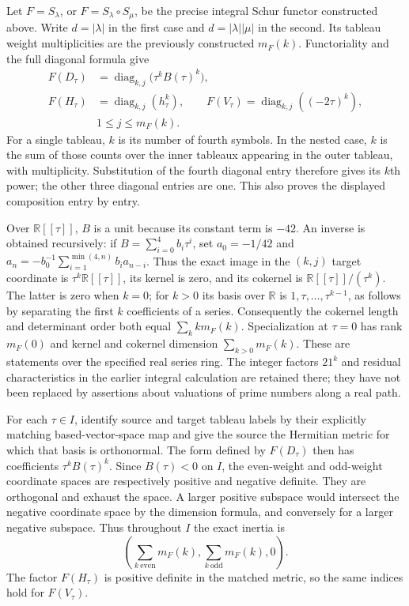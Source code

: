 Let $F=S_\lambda$, or $F=S_\lambda\circ S_\mu$, be the precise
integral Schur functor constructed above. Write $d=|\lambda|$ in
the first case and $d=|\lambda||\mu|$ in the second. Its tableau
weight multiplicities are the previously constructed $m_F(k)$.
Functoriality and the full diagonal formula give
\begin{equation}\label{eq:ns-schur-path-diagonal}
 \begin{aligned}
 F(D_\tau)&=\operatorname{diag}_{k,j}
       \bigl(\tau^k B(\tau)^k\bigr),\\
 F(H_\tau)&=\operatorname{diag}_{k,j}(h_\tau^k),\qquad
 F(V_\tau)=\operatorname{diag}_{k,j}((-2\tau)^k),\\
 &1\leq j\leq m_F(k).
 \end{aligned}
\end{equation}
For a single tableau, $k$ is its number of fourth symbols. In the
nested case, $k$ is the sum of those counts over the inner tableaux
appearing in the outer tableau, with multiplicity. Substitution of the fourth diagonal entry therefore
gives its $k$th power; the other three diagonal entries are one.
This also proves the displayed composition entry by entry.

Over $\mathbb R[[\tau]]$, $B$ is a unit because its constant term
is $-42$. An inverse is obtained recursively: if
$B=\sum_{i=0}^4b_i\tau^i$, set $a_0=-1/42$ and
$a_n=-b_0^{-1}\sum_{i=1}^{\min(4,n)}b_i a_{n-i}$.
Thus the exact image in the $(k,j)$ target coordinate is
$\tau^k\mathbb R[[\tau]]$, its kernel is zero, and its cokernel
is $\mathbb R[[\tau]]/(\tau^k)$. The latter is zero when $k=0$;
for $k>0$ its basis over $\mathbb R$ is $1,\tau,\ldots,\tau^{k-1}$,
as follows by separating the first $k$ coefficients of a series.
Consequently the cokernel length and determinant order both equal
$\sum_k k m_F(k)$. Specialization at $\tau=0$ has rank $m_F(0)$
and kernel and cokernel dimension $\sum_{k>0}m_F(k)$.
These are statements over the specified real series ring. The integer
factors $21^k$ and residual characteristics in the earlier integral
calculation are retained there; they have not been replaced by assertions
about valuations of prime numbers along a real path.

For each $\tau\in I$, identify source and target tableau labels by
their explicitly matching based-vector-space map and give the source
the Hermitian metric for which that basis is orthonormal. The form
defined by $F(D_\tau)$ then has coefficients $\tau^kB(\tau)^k$.
Since $B(\tau)<0$ on $I$, the even-weight and odd-weight coordinate
spaces are respectively positive and negative definite. They are
orthogonal and exhaust the space. A larger positive subspace would
intersect the negative coordinate space by the dimension formula,
and conversely for a larger negative subspace. Thus throughout $I$
the exact inertia is
\[
 \left(\sum_{k\ \text{even}}m_F(k),
       \sum_{k\ \text{odd}}m_F(k),0\right).
\]
The factor $F(H_\tau)$ is positive definite in the matched metric,
so the same indices hold for $F(V_\tau)$.

